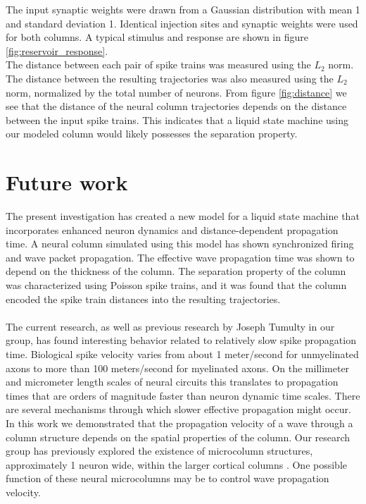 \documentclass[a4paper,11pt]{article}
\begin{document}
The input synaptic weights were drawn from a Gaussian distribution with mean 1 and standard deviation 1.
Identical injection sites and synaptic weights were used for both columns. 
A typical stimulus and response are shown in figure \ref{fig:reservoir_response}.\\
The distance between each pair of spike trains was measured using the $L_2$ norm.
The distance between the resulting trajectories was also measured using the $L_2$ norm, normalized by the total number of neurons.
From figure \ref{fig:distance} we see that the distance of the neural column trajectories depends on the distance between the input spike trains.
This indicates that a liquid state machine using our modeled column would likely possesses the separation property.

\section{Future work}
The present investigation has created a new model for a liquid state machine that incorporates enhanced neuron dynamics and distance-dependent propagation time.
A neural column simulated using this model has shown synchronized firing and wave packet propagation.
The effective wave propagation time was shown to depend on the thickness of the column.
The separation property of the column was characterized using Poisson spike trains, and it was found that the column encoded the spike train distances into the resulting trajectories.
\\ \\
The current research, as well as previous research by Joseph Tumulty in our group, has found interesting behavior related to relatively slow spike propagation time.
Biological spike velocity varies from about 1 meter/second for unmyelinated axons to  more than 100 meters/second for myelinated axons.
On the millimeter and micrometer length scales of neural circuits this translates to propagation times that are orders of magnitude faster than neuron dynamic time scales.
There are several mechanisms through which slower effective propagation might occur.
\\
In this work we demonstrated that the propagation velocity of a wave through a column structure depends on the spatial properties of the column.
Our research group has previously explored the existence of microcolumn structures, approximately 1 neuron wide, within the larger cortical columns \cite{cruz2000}.
One possible function of these neural microcolumns may be to control wave propagation velocity. 
\end{document}
